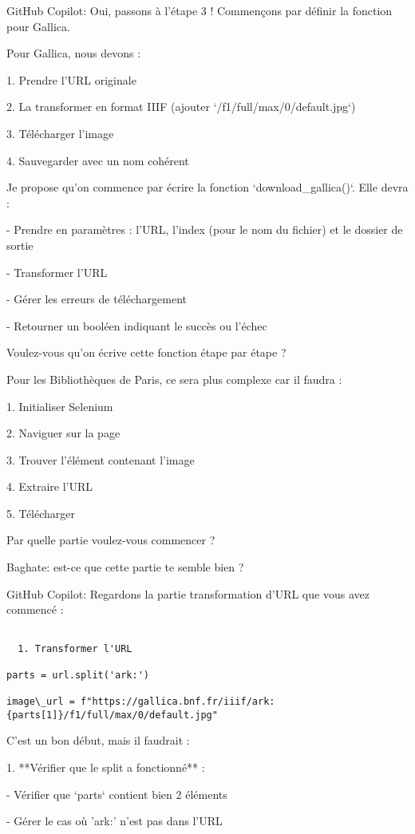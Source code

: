 GitHub Copilot: Oui, passons à l'étape 3 ! Commençons par définir la fonction pour Gallica.

Pour Gallica, nous devons :

1. Prendre l'URL originale

2. La transformer en format IIIF (ajouter `/f1/full/max/0/default.jpg`)

3. Télécharger l'image

4. Sauvegarder avec un nom cohérent

Je propose qu'on commence par écrire la fonction `download\_gallica()`. Elle devra :

- Prendre en paramètres : l'URL, l'index (pour le nom du fichier) et le dossier de sortie

- Transformer l'URL

- Gérer les erreurs de téléchargement

- Retourner un booléen indiquant le succès ou l'échec

Voulez-vous qu'on écrive cette fonction étape par étape ?

Pour les Bibliothèques de Paris, ce sera plus complexe car il faudra :

1. Initialiser Selenium

2. Naviguer sur la page

3. Trouver l'élément contenant l'image

4. Extraire l'URL

5. Télécharger

Par quelle partie voulez-vous commencer ?

Baghate: est-ce que cette partie te semble bien ?

GitHub Copilot: Regardons la partie transformation d'URL que vous avez commencé :

\begin{verbatim}

  1. Transformer l'URL

parts = url.split('ark:')

image\_url = f"https://gallica.bnf.fr/iiif/ark:{parts[1]}/f1/full/max/0/default.jpg"

\end{verbatim}

C'est un bon début, mais il faudrait :

1. **Vérifier que le split a fonctionné** :

- Vérifier que `parts` contient bien 2 éléments

- Gérer le cas où 'ark:' n'est pas dans l'URL

